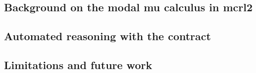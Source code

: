 \documentclass{article}
\begin{document}
\subsection{Background on the modal mu calculus in mcrl2}

\subsection{Automated reasoning with the contract}

\subsection{Limitations and future work}






\newpage



\end{document}
